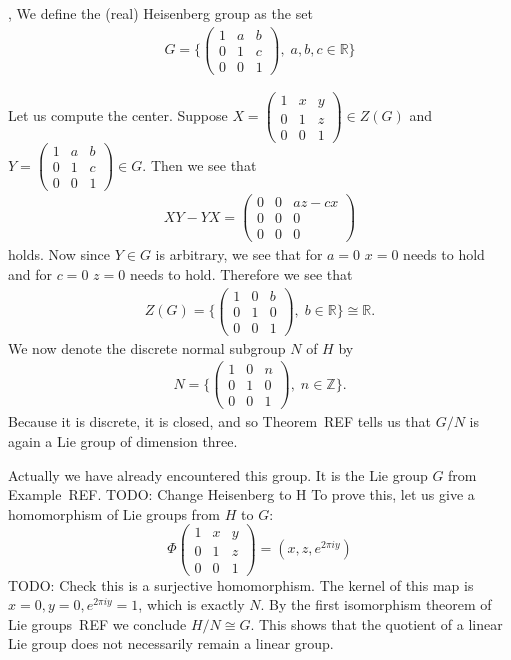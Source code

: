 \begin{definition}
\textup{\cite[10.2]{Fulton2004}, \cite[4.8]{Hall2015}}
We define the (real) Heisenberg group as the set
\begin{align*}
G = \Bigg\{\begin{pmatrix}
1 &a &b\\
0 &1 &c\\
0 &0 &1
\end{pmatrix}, \; a,b,c \in \mathbb{R} \Bigg\}
\end{align*} 
\end{definition}
Let us compute the center.
Suppose $X = \begin{pmatrix}
1 &x &y\\
0 &1 &z\\
0 &0 &1
\end{pmatrix} \in Z(G)$ and $Y= \begin{pmatrix}
1 &a &b\\
0 &1 &c\\
0 &0 &1
\end{pmatrix} \in G$. Then we see that 
\begin{align*}
XY - YX = \begin{pmatrix}
0 &0 &az-cx\\
0 &0 &0\\
0 &0 &0
\end{pmatrix}
\end{align*} holds. Now since $Y \in G$ is arbitrary, we see that for $a=0$ $x=0$ needs to hold and for $c=0$ $z=0$ needs to hold. Therefore we see that 
\begin{align*}
Z(G) = \Bigg\{\begin{pmatrix}
1 &0 &b\\
0 &1 &0\\
0 &0 &1
\end{pmatrix}, \; b \in \mathbb{R}\Bigg\} \cong \mathbb{R}.
\end{align*}
We now denote the discrete normal subgroup $N$ of $H$ by 
\begin{align*}
N = \Bigg\{\begin{pmatrix}
1 &0 &n\\
0 &1 &0\\
0 &0 &1
\end{pmatrix}, \; n \in \mathbb{Z}\Bigg\}.
\end{align*}
Because it is discrete, it is closed, and so Theorem~REF tells us that $G/N$ is again a Lie group of dimension three.

Actually we have already encountered this group.
It is the Lie group $G$ from Example~REF.
TODO: Change Heisenberg to H
To prove this, let us give a homomorphism of Lie groups from $H$ to $G$:
\[
\Phi\begin{pmatrix}
1 &x &y\\
0 &1 &z\\
0 &0 &1
\end{pmatrix}
= (x,z,e^{2\pi i y})
\]
TODO: Check this is a surjective homomorphism.
The kernel of this map is $x = 0,y=0, e^{2\pi i y} = 1$, which is exactly $N$.
By the first isomorphism theorem of Lie groups~REF we conclude $H/N \cong G$.
This shows that the quotient of a linear Lie group does not necessarily remain a linear group.
